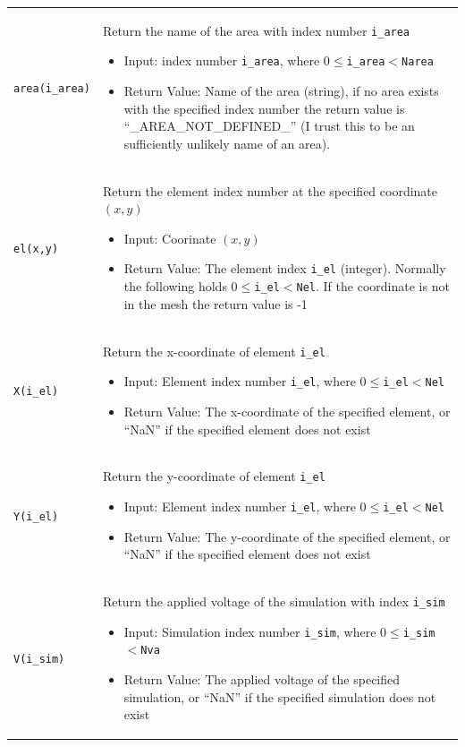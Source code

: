 \documentclass[noshowpacs,preprintnumbers,amsmath,amssymb, letter]{revtex4}
\begin{document}
\begin{longtable}{p{}p{}}
\texttt{area(i\_area)} 	& Return the name of the area with index number \texttt{i\_area}
\begin{itemize}
\item Input: index number \texttt{i\_area}, where $ 0 \le $\texttt{i\_area}$ < $\texttt{Narea}
\item Return Value: Name of the area (string), if no area exists with the specified index number the return value is ``\_AREA\_NOT\_DEFINED\_'' (I trust this to be an sufficiently unlikely name of an area).
\end{itemize}\\
\texttt{el(x,y)} 	& Return the element index number at the specified coordinate $(x,y)$
\begin{itemize}
\item Input: Coorinate $(x,y)$
\item Return Value: The element index \texttt{i\_el} (integer). Normally the following holds $0 \le $\texttt{i\_el}$ < $\texttt{Nel}. If the coordinate is not in the mesh the return value is -1 
\end{itemize}\\
\texttt{X(i\_el)}	& Return the x-coordinate of element \texttt{i\_el}
\begin{itemize}
\item Input: Element index number \texttt{i\_el}, where $0 \le $\texttt{i\_el}$ < $\texttt{Nel}
\item Return Value: The x-coordinate of the specified element, or ``NaN'' if the specified element does not exist
\end{itemize} \\
\texttt{Y(i\_el)}	& Return the y-coordinate of element \texttt{i\_el}
\begin{itemize}
\item Input: Element index number \texttt{i\_el}, where $0 \le $\texttt{i\_el}$ < $\texttt{Nel}
\item Return Value: The y-coordinate of the specified element, or ``NaN'' if the specified element does not exist
\end{itemize}\\
\texttt{V(i\_sim)}	& Return the applied voltage of the simulation with index \texttt{i\_sim}
\begin{itemize}
\item Input: Simulation index number \texttt{i\_sim}, where $0 \le $\texttt{i\_sim}$ < $\texttt{Nva}
\item Return Value: The applied voltage of the specified simulation, or ``NaN'' if the specified simulation does not exist

\end{itemize}
\end{longtable}
\end{document}
